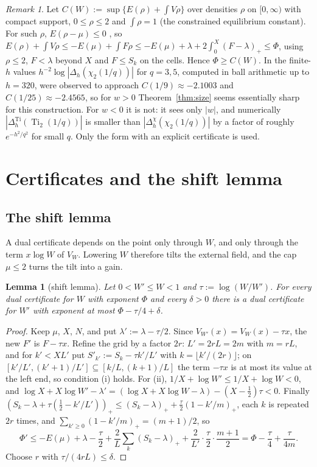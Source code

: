 \documentclass[11pt]{amsart}
\newtheorem{lemma}[theorem]{Lemma}
\theoremstyle{definition}
\theoremstyle{remark}
\newtheorem{remark}[theorem]{Remark}
\numberwithin{equation}{section}
\newcommand{\Ti}{\operatorname{Ti}}
\begin{document}
\begin{remark}
Let $C(W):=\sup\{E(\rho)+\int V\rho\}$ over densities $\rho$ on $[0,\infty)$ with compact support, $0\le\rho\le2$ and
$\int\rho=1$ (the constrained equilibrium constant). For such $\rho$, $E(\rho-\mu)\le0$ \cite[Lemma~I.1.8]{SaffTotik},
so $E(\rho)+\int V\rho\le-E(\mu)+\int F\rho\le-E(\mu)+\lambda+2\int_0^X(F-\lambda)_+\le\Phi$, using $\rho\le2$, $F<\lambda$
beyond $X$ and $F\le S_k$ on the cells. Hence
$\Phi\ge C(W)$. In \cite{Chi2Paper} the finite-$h$ values $h^{-2}\log|\Delta_h(\chi_2(1/q))|$ for $q=3,5$, computed in
ball arithmetic up to $h=320$, were observed to approach $C(1/9)\approx-2.1003$ and $C(1/25)\approx-2.4565$, so for
$w>0$ Theorem~\ref{thm:size} seems essentially sharp for this construction. For $w<0$ it is not: it sees only $|w|$, and
numerically $|\Delta^{\Ti}_h(\Ti_2(1/q))|$ is smaller than $|\Delta^\chi_h(\chi_2(1/q))|$ by a factor of roughly
$e^{-h^2/q^2}$ for small $q$. Only the form with an explicit certificate is used.
\end{remark}

\section{Certificates and the shift lemma}\label{sec:cert}

\subsection{The shift lemma}
A dual certificate depends on the point only through $W$, and only through the term $x\log W$ of $V_W$. Lowering $W$
therefore tilts the external field, and the cap $\mu\le2$ turns the tilt into a gain.

\begin{lemma}[shift lemma]\label{lem:shift}
Let $0<W'\le W<1$ and $\tau:=\log(W/W')$. For every dual certificate for $W$ with exponent $\Phi$ and every $\delta>0$
there is a dual certificate for $W'$ with exponent at most $\Phi-\tau/4+\delta$.
\end{lemma}

\begin{proof}
Keep $\mu$, $X$, $N$, and put $\lambda':=\lambda-\tau/2$. Since $V_{W'}(x)=V_W(x)-\tau x$, the new $F'$ is $F-\tau x$.
Refine the grid by a factor $2r$: $L'=2rL=2m$ with $m=rL$, and for $k'<XL'$ put $S'_{k'}:=S_k-\tau k'/L'$ with
$k=\lfloor k'/(2r)\rfloor$; on $[k'/L',(k'+1)/L']\subseteq[k/L,(k+1)/L]$ the term $-\tau x$ is at most its value at the left
end, so condition (i) holds. For (ii), $1/X+\log W'\le1/X+\log W<0$, and
$\log X+X\log W'-\lambda'=(\log X+X\log W-\lambda)-(X-\frac12)\tau<0$. Finally
$(S_k-\lambda+\tau(\frac12-k'/L'))_+\le(S_k-\lambda)_++\frac\tau2(1-k'/m)_+$, each $k$ is repeated $2r$ times, and
$\sum_{k'\ge0}(1-k'/m)_+=(m+1)/2$, so
\[
  \Phi'\le-E(\mu)+\lambda-\frac\tau2+\frac2L\sum_k(S_k-\lambda)_++\frac{2}{L'}\cdot\frac\tau2\cdot\frac{m+1}2
  =\Phi-\frac\tau4+\frac{\tau}{4m}.
\]
Choose $r$ with $\tau/(4rL)\le\delta$.
\end{proof}
\end{document}
